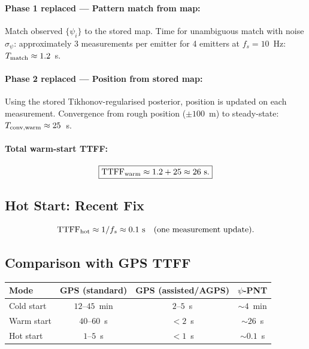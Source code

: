 \documentclass[aps,prd,twocolumn,superscriptaddress,nofootinbib]{revtex4-2}
\newcommand{\TTFF}{\mathrm{TTFF}}
\begin{document}
\paragraph{Phase 1 replaced --- Pattern match from map:}
Match observed $\{\psi_i\}$ to the stored map.  Time for unambiguous
match with noise $\sigma_\psi$: approximately 3 measurements per emitter
for 4 emitters at $f_s = 10$~Hz: $T_{\rm match} \approx 1.2$~s.

\paragraph{Phase 2 replaced --- Position from stored map:}
Using the stored Tikhonov-regularised posterior, position is updated
on each measurement.  Convergence from rough position ($\pm 100$~m)
to steady-state: $T_{\rm conv,warm} \approx 25$~s.

\paragraph{Total warm-start TTFF:}
\begin{equation}
  \boxed{
  \TTFF_{\rm warm} \approx 1.2 + 25 \approx 26~\mathrm{s}.
  }
  \label{eq:ttff-warm}
\end{equation}

\subsection{Hot Start: Recent Fix}

\begin{equation}
  \TTFF_{\rm hot} \approx 1/f_s \approx 0.1~\mathrm{s}
  \quad\text{(one measurement update).}
  \label{eq:ttff-hot}
\end{equation}

\subsection{Comparison with GPS TTFF}

\begin{center}
\begin{tabular}{lccc}
\toprule
Mode & GPS (standard) & GPS (assisted/AGPS) & $\psi$-PNT \\
\midrule
Cold start & $12$--$45$~min & $2$--$5$~s & $\sim 4$~min \\
Warm start & $40$--$60$~s & $< 2$~s & $\sim 26$~s \\
Hot start & $1$--$5$~s & $< 1$~s & $\sim 0.1$~s \\
\bottomrule
\end{tabular}
\end{center}
\end{document}
